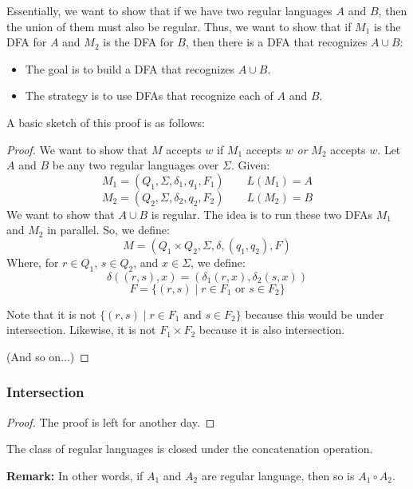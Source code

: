 \documentclass[letterpaper]{article}
\begin{document}
Essentially, we want to show that if we have two regular languages $A$ and $B$, then the union of them must also be regular. Thus, we want to show that if $M_1$ is the DFA for $A$ and $M_2$ is the DFA for $B$, then there is a DFA that recognizes $A \cup B$:
\begin{itemize}
    \item The goal is to build a DFA that recognizes $A \cup B$. 
    \item The strategy is to use DFAs that recognize each of $A$ and $B$. 
\end{itemize}
A basic sketch of this proof is as follows: 
\begin{mdframed}[]
    \begin{proof}
        We want to show that $M$ accepts $w$ if $M_1$ accepts $w$ \emph{or} $M_2$ accepts $w$. Let $A$ and $B$ be any two regular languages over $\Sigma$. Given:
        \[M_1 = (Q_1, \Sigma, \delta_1, q_1, F_1) \qquad L(M_1) = A\]
        \[M_2 = (Q_2, \Sigma, \delta_2, q_2, F_2) \qquad L(M_2) = B\]
        We want to show that $A \cup B$ is regular. The idea is to run these two DFAs $M_1$ and $M_2$ in parallel. So, we define: 
        \[M = (Q_1 \times Q_2, \Sigma, \delta, (q_1, q_2), F)\]
        Where, for $r \in Q_1$, $s \in Q_2$, and $x \in \Sigma$, we define:
        \[\delta((r, s), x) = (\delta_{1}(r, x), \delta_{2}(s, x))\]
        \[F = \{(r, s) \mid r \in F_1 \text{ or } s \in F_2\}\]
        \begin{mdframed}[]
            Note that it is not $\{(r, s) \mid r \in F_1 \text{ and } s \in F_2\}$ because this would be under intersection. Likewise, it is not $F_1 \times F_2$ because it is also intersection. 
        \end{mdframed}

        (And so on...)
    \end{proof}
\end{mdframed}

\subsubsection{Intersection}
\begin{mdframed}[]
    \begin{proof}
        The proof is left for another day.
    \end{proof}
\end{mdframed}

\begin{theorem}{}{}
    The class of regular languages is closed under the concatenation operation.
\end{theorem}
\textbf{Remark:} In other words, if $A_1$ and $A_2$ are regular language, then so is $A_1 \circ A_2$.
\end{document}
